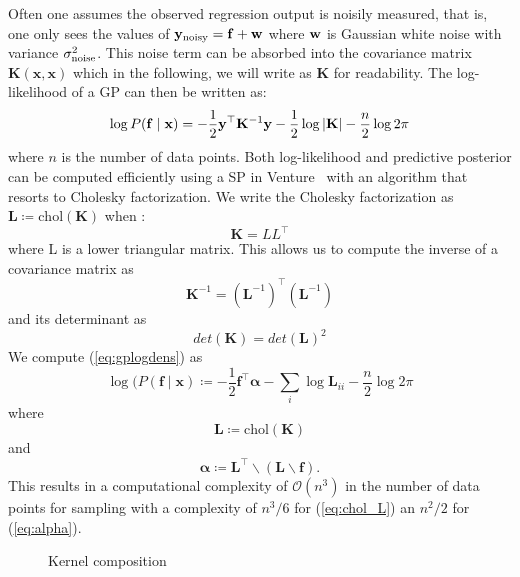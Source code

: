 Often one assumes the observed regression output is noisily measured, that is, one only sees the values of $\mathbf{y}_{\textrm{noisy}} = \mathbf{f}+ \mathbf{w}$ where $\mathbf{w}$ is Gaussian white noise with variance $\sigma_{\textrm{noise}}^2$. This noise term can be absorbed into the covariance matrix $\mathbf{K}(\mathbf{x},\mathbf{x})$ which in the following, we will write as $\mathbf{K}$ for readability. The log-likelihood of a \ac{GP} can then be written as:
\begin{equation}
\label{eq:gplogdens}
\log P(\mathbf{f} \mid \mathbf{x}) =
-\frac12 \mathbf{y}^\top 
\mathbf{K}^{-1} \mathbf{y}
- \frac12\log \left\lvert \mathbf{K} \right\rvert
- \frac{n}{2}\log 2\pi
\end{equation}
where $n$ is the number of data points.
Both log-likelihood and predictive posterior can be computed efficiently using a \ac{SP} in Venture~\citep{mansinghka2014venture}
with an algorithm that resorts to Cholesky factorization\citep[chap. 2]{rasmussen2006gaussian}. 
We write the Cholesky factorization as 
$\mathbf{L} \coloneqq \text{chol}(\mathbf{K})$ when
:
\begin{equation}
\mathbf{K} = LL^\top
\end{equation}
where L is a lower triangular matrix. This allows us to compute the inverse of a covariance matrix as
\begin{equation}
\mathbf{K}^{-1} = (\mathbf{L}^{-1})^\top (\mathbf{L}^{-1})
\end{equation}
and its determinant as 
\begin{equation}
det(\mathbf{K}) = det(\mathbf{L})^2
\end{equation}
We compute (\ref{eq:gplogdens}) as
\begin{equation}
\log(P(\mathbf{f}\mid \mathbf{x})\coloneqq - \frac{1}{2} \mathbf{f}^\top \bm{\alpha} - \sum_i \log \mathbf{L}_{ii} - \frac{n}{2} \log 2 \pi
\end{equation}
where 
\begin{equation}
\label{eq:chol_L}
\mathbf{L} \coloneqq \text{chol}(\mathbf{K})
\end{equation}
and 
\begin{equation}
\label{eq:alpha}
\bm{\alpha} \coloneqq  \mathbf{L}^\top \backslash(\mathbf{L} \backslash \mathbf{f}). 
\end{equation}
This results in a computational complexity of $\mathcal{O}(n^3)$ in the number of data points for
sampling with a complexity of $n^3/6$ for (\ref{eq:chol_L}) an $n^2/2$ for (\ref{eq:alpha}). 

\begin{figure}

\caption{Kernel composition}
\end{figure}


